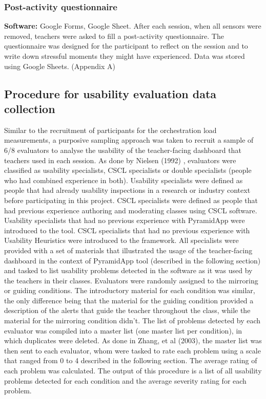 \subsubsection{Post-activity questionnaire}
\textbf{Software:} Google Forms, Google Sheet.
After each session, when all sensors were removed, teachers were asked to fill a post-activity questionnaire. The questionnaire was designed for the participant to reflect on the session and to write down stressful moments they might have experienced. Data was stored using Google Sheets. (Appendix A)
\subsection{Procedure for usability evaluation data collection}
Similar to the recruitment of participants for the orchestration load measurements, a purposive sampling approach was taken to recruit a sample of 6/8 evaluators to analyse the usability of the teacher-facing dashboard that teachers used in each session. As done by Nielsen (1992) \cite{Nielsen1994-un}, evaluators were classified as usability specialists, CSCL specialists or double specialists (people who had combined experience in both). Usability specialists were defined as people that had already usability inspections in a research or industry context before participating in this project. CSCL specialists were defined as people that had previous experience authoring and moderating classes using CSCL software.
Usability specialists that had no previous experience with PyramidApp were introduced to the tool. CSCL specialists that had no previous experience with Usability Heuristics were introduced to the framework.
All specialists were provided with a set of materials that illustrated the usage of the teacher-facing dashboard in the context of PyramidApp tool (described in the following section) and tasked to list usability problems detected in the software as it was used by the teachers in their classes. Evaluators were randomly assigned to the mirroring or guiding conditions. The introductory material for each condition was similar, the only difference being that the material for the guiding condition provided a description of the alerts that guide the teacher throughout the class, while the material for the mirroring condition didn't. The list of problems detected by each evaluator was compiled into a master list (one master list per condition), in which duplicates were deleted. As done in Zhang, et al (2003)\cite{zhang_johnson_patel_paige_kubose_2003}, the master list was then sent to each evaluator, whom were tasked to rate each problem using a scale that ranged from 0 to 4 described in the following section. The average rating of each problem was calculated. The output of this procedure is a list of all usability problems detected for each condition and the average severity rating for each problem.

